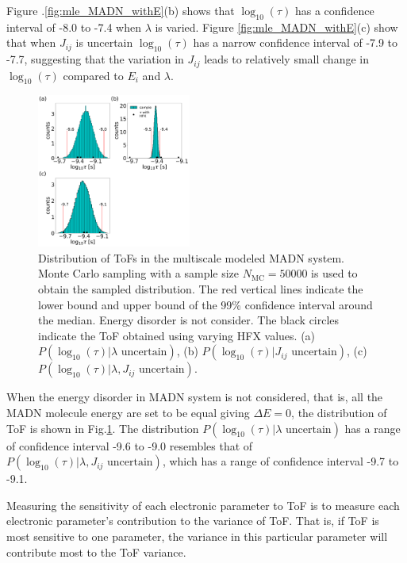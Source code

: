 \documentclass[%
 reprint,
superscriptaddress,
 amsmath,amssymb,
 aps,
prb,
floatfix
]{revtex4-2}
\begin{document}
Figure .\ref{fig:mle_MADN_withE}(b) shows that $\log_{10}(\tau)$ has a confidence interval of -8.0 to -7.4 when $\lambda$ is varied. 
Figure \ref{fig:mle_MADN_withE}(c) show that when $J_{ij}$ is uncertain $\log_{10}(\tau)$ has a narrow confidence interval of -7.9 to -7.7, suggesting that the variation in $J_{ij}$ leads to relatively small change in $\log_{10}(\tau)$ compared to $E_i$ and $\lambda$.

%
\begin{figure}[t]
  \centering
  \includegraphics[width=0.45\textwidth]{figs/fig_mle_MADN_noE.pdf}
  \caption{Distribution of ToFs in the multiscale modeled MADN system.
  Monte Carlo sampling with a sample size $N_\text{MC}=50000$ is used to obtain the sampled distribution. The red vertical lines indicate the lower bound and upper bound of the 99\% confidence interval around the median.
  Energy disorder is not consider. 
  The black circles indicate the ToF obtained using varying HFX values.
  (a) $P(\log_{10}(\tau)|\lambda \text{ uncertain})$, 
  (b) $P(\log_{10}(\tau)|J_{ij} \text{ uncertain})$, 
  (c) $P(\log_{10}(\tau)|\lambda, J_{ij} \text{ uncertain})$. }
  \label{fig:mle_MADN_noE}
\end{figure}
%

When the energy disorder in MADN system is not considered, that is, all the MADN molecule energy are set to be equal giving $\Delta E=0$, the distribution of ToF is shown in Fig.\ref{fig:mle_MADN_noE}. 
The distribution $P(\log_{10}(\tau)|\lambda \text{ uncertain})$ has a range of confidence interval -9.6 to -9.0 resembles that of $P(\log_{10}(\tau)|\lambda, J_{ij} \text{ uncertain})$, which has a range of confidence interval -9.7 to -9.1. 

Measuring the sensitivity of each electronic parameter to ToF is to measure each electronic parameter's contribution to the variance of ToF. 
That is, if ToF is most sensitive to one parameter, the variance in this particular parameter will contribute most to the ToF variance. 
\end{document}

